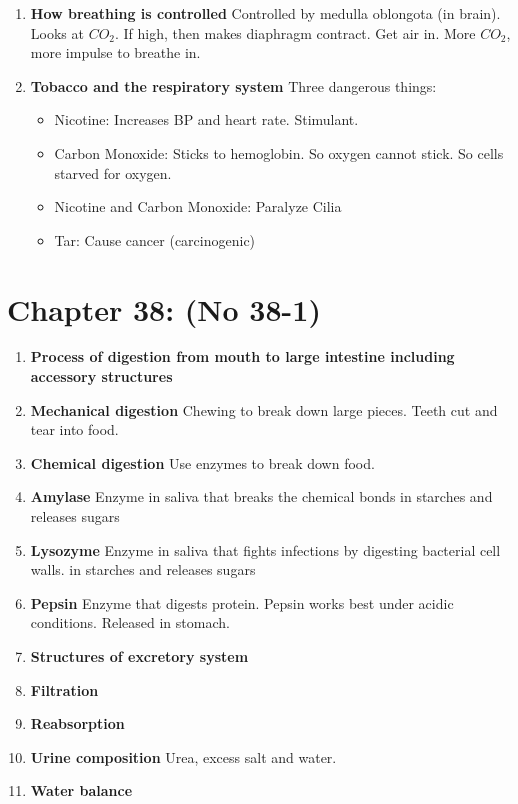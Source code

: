 \documentclass[9pt]{article}
\begin{document}
\begin{enumerate}
\begin{itemize}
    \end{itemize}
  \item {\bf How breathing is controlled} Controlled by medulla
    oblongota (in brain). Looks at $CO_2$. If high, then makes
    diaphragm contract. Get air in. More $CO_2$, more impulse to
    breathe in.
  \item {\bf Tobacco and the respiratory system} Three dangerous
    things:
    \begin{itemize}
    \item Nicotine: Increases BP and heart rate. Stimulant.
    \item Carbon Monoxide: Sticks to hemoglobin. So oxygen cannot stick. So cells starved for oxygen.
    \item Nicotine and Carbon Monoxide: Paralyze Cilia
    \item Tar: Cause cancer (carcinogenic)
    \end{itemize}
\end{enumerate}
\section*{Chapter 38: (No 38-1)}
\begin{enumerate}
  \item {\bf Process of digestion from mouth to large intestine including accessory structures}
  \item {\bf Mechanical digestion} Chewing to break down large
    pieces. Teeth cut and tear into food.
  \item {\bf Chemical digestion}  Use enzymes to break down food.
  \item {\bf Amylase} Enzyme in saliva that breaks the chemical bonds
    in starches and releases sugars
  \item {\bf Lysozyme} Enzyme in saliva that fights infections by
    digesting bacterial cell walls.  in starches and releases sugars
  \item {\bf Pepsin} Enzyme that digests protein. Pepsin works best
    under acidic conditions. Released in stomach.
  \item {\bf Structures of excretory system}
  \item {\bf Filtration}
  \item {\bf Reabsorption}
  \item {\bf Urine composition} Urea, excess salt and water.
  \item {\bf Water balance}
\end{enumerate}
\end{document}
